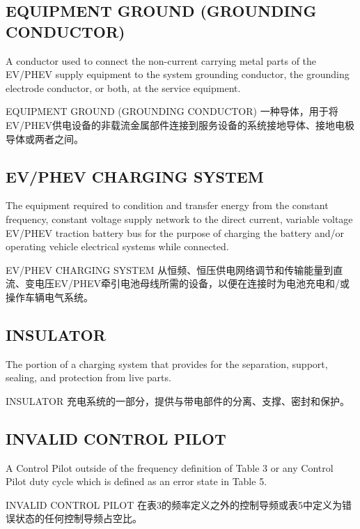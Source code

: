         \subsection*{EQUIPMENT GROUND (GROUNDING CONDUCTOR)}
        \label{def13}
        A conductor used to connect the non-current carrying metal parts of the EV/PHEV supply equipment to the system grounding conductor, the grounding electrode conductor, or both, at the service equipment.
        \begin{definition}{EQUIPMENT GROUND (GROUNDING CONDUCTOR)}
        一种导体，用于将EV/PHEV供电设备的非载流金属部件连接到服务设备的系统接地导体、接地电极导体或两者之间。
        \end{definition}
        
        \subsection*{EV/PHEV CHARGING SYSTEM}
        \label{def14}
        The equipment required to condition and transfer energy from the constant frequency, constant voltage supply network to the direct current, variable voltage EV/PHEV traction battery bus for the purpose of charging the battery and/or operating vehicle electrical systems while connected.
        \begin{definition}{EV/PHEV CHARGING SYSTEM}
        从恒频、恒压供电网络调节和传输能量到直流、变电压EV/PHEV牵引电池母线所需的设备，以便在连接时为电池充电和/或操作车辆电气系统。
        \end{definition}
        
        \subsection*{INSULATOR}
        \label{def15}
        The portion of a charging system that provides for the separation, support, sealing, and protection from live parts.
        \begin{definition}{INSULATOR}
        充电系统的一部分，提供与带电部件的分离、支撑、密封和保护。
        \end{definition}
        
        \subsection*{INVALID CONTROL PILOT}
        \label{def16}
        A Control Pilot outside of the frequency definition of Table 3 or any Control Pilot duty cycle which is defined as an error state in Table 5.
        \begin{definition}{INVALID CONTROL PILOT}
        在表3的频率定义之外的控制导频或表5中定义为错误状态的任何控制导频占空比。
        \end{definition}
        
